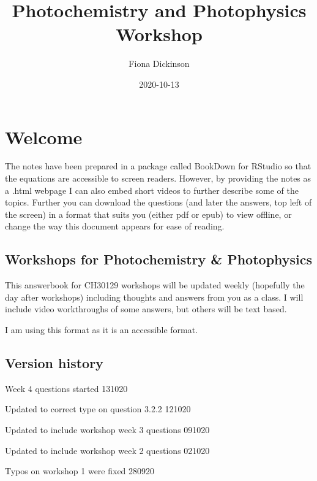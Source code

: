 \documentclass[
]{book}
\title{Photochemistry and Photophysics Workshop}
\author{Fiona Dickinson}
\date{2020-10-13}
\begin{document}
\maketitle

{
\setcounter{tocdepth}{1}
\tableofcontents
}
\hypertarget{welcome}{%
\chapter*{Welcome}\label{welcome}}

The notes have been prepared in a package called BookDown for RStudio so that the equations are accessible to screen readers. However, by providing the notes as a .html webpage I can also embed short videos to further describe some of the topics. Further you can download the questions (and later the answers, top left of the screen) in a format that suits you (either pdf or epub) to view offline, or change the way this document appears for ease of reading.

\hypertarget{workshops-for-photochemistry-photophysics}{%
\section*{Workshops for Photochemistry \& Photophysics}\label{workshops-for-photochemistry-photophysics}}

This answerbook for CH30129 workshops will be updated weekly (hopefully the day after workshops) including thoughts and answers from you as a class. I will include video workthroughs of some answers, but others will be text based.

I am using this format as it is an accessible format.

\hypertarget{version-history}{%
\section*{Version history}\label{version-history}}

Week 4 questions started 131020

Updated to correct type on question 3.2.2 121020

Updated to include workshop week 3 questions 091020

Updated to include workshop week 2 questions 021020

Typos on workshop 1 were fixed 280920
\end{document}
